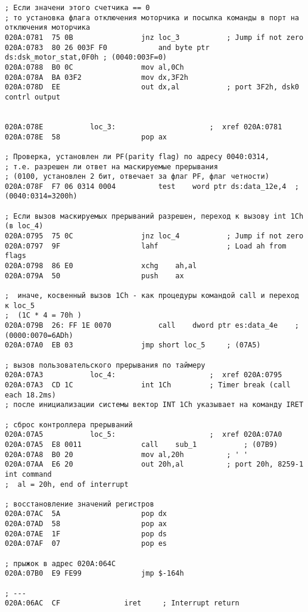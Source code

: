 \begin{lstlisting}[style={asm}]
; Если значени этого счетчика == 0
; то установка флага отключения моторчика и посылка команды в порт на отключения моторчика
020A:0781  75 0B				jnz	loc_3			; Jump if not zero
020A:0783  80 26 003F F0			and	byte ptr ds:dsk_motor_stat,0F0h	; (0040:003F=0)
020A:0788  B0 0C				mov	al,0Ch
020A:078A  BA 03F2				mov	dx,3F2h
020A:078D  EE					out	dx,al			; port 3F2h, dsk0 contrl output


020A:078E			loc_3:						;  xref 020A:0781
020A:078E  58					pop	ax

; Проверка, установлен ли PF(parity flag) по адресу 0040:0314, 
; т.е. разрешен ли ответ на маскируемые прерывания
; (0100, установлен 2 бит, отвечает за флаг PF, флаг четности)
020A:078F  F7 06 0314 0004			test	word ptr ds:data_12e,4	; (0040:0314=3200h)

; Если вызов маскируемых прерываний разрешен, переход к вызову int 1Ch (в loc_4)
020A:0795  75 0C				jnz	loc_4			; Jump if not zero
020A:0797  9F					lahf				; Load ah from flags
020A:0798  86 E0				xchg	ah,al
020A:079A  50					push	ax

;  иначе, косвенный вызов 1Сh - как процедуры командой call и переход к loc_5
;  (1C * 4 = 70h )
020A:079B  26: FF 1E 0070			call	dword ptr es:data_4e	; (0000:0070=6ADh)
020A:07A0  EB 03				jmp	short loc_5		; (07A5)

; вызов пользовательского прерывания по таймеру	
020A:07A3			loc_4:						;  xref 020A:0795
020A:07A3  CD 1C				int	1Ch			; Timer break (call each 18.2ms)
; после инициализации системы вектор INT 1Ch указывает на команду IRET

; сброс контроллера прерываний
020A:07A5			loc_5:						;  xref 020A:07A0
020A:07A5  E8 0011				call	sub_1			; (07B9)
020A:07A8  B0 20				mov	al,20h			; ' '
020A:07AA  E6 20				out	20h,al			; port 20h, 8259-1 int command
;  al = 20h, end of interrupt

; восстановление значений регистров
020A:07AC  5A					pop	dx
020A:07AD  58					pop	ax
020A:07AE  1F					pop	ds
020A:07AF  07					pop	es

; прыжок в адрес 020A:064C
020A:07B0  E9 FE99				jmp	$-164h

; ---
020A:06AC  CF				iret	 ; Interrupt return

\end{lstlisting}

\clearpage

